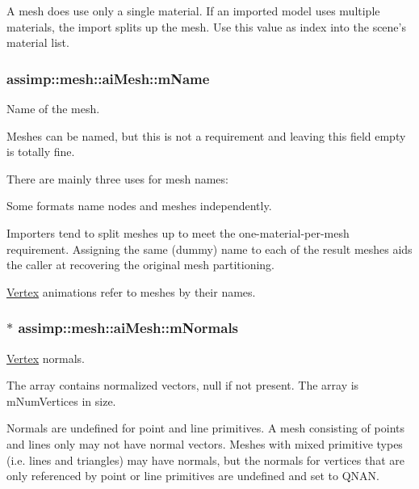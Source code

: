 A mesh does use only a single material. If an imported model uses multiple materials, the import splits up the mesh. Use this value as index into the scene's material list. \hypertarget{structassimp_1_1mesh_1_1ai_mesh_a3ffa3325c59b7ab92e4743862d47b70f}{
\subsubsection[{m\+Name}]{ assimp\+::mesh\+::ai\+Mesh\+::m\+Name}}\label{structassimp_1_1mesh_1_1ai_mesh_a3ffa3325c59b7ab92e4743862d47b70f}
Name of the mesh.

Meshes can be named, but this is not a requirement and leaving this field empty is totally fine.

There are mainly three uses for mesh names\+:
\begin{DoxyItemize}
\item Some formats name nodes and meshes independently.
\item Importers tend to split meshes up to meet the one-\/material-\/per-\/mesh requirement. Assigning the same (dummy) name to each of the result meshes aids the caller at recovering the original mesh partitioning.
\item \hyperlink{struct_vertex}{Vertex} animations refer to meshes by their names. 
\end{DoxyItemize}\hypertarget{structassimp_1_1mesh_1_1ai_mesh_aee935013afc416792a945b36f7e99d5f}{
\subsubsection[{m\+Normals}]{$\ast$ assimp\+::mesh\+::ai\+Mesh\+::m\+Normals}}\label{structassimp_1_1mesh_1_1ai_mesh_aee935013afc416792a945b36f7e99d5f}
\hyperlink{struct_vertex}{Vertex} normals.

The array contains normalized vectors, null if not present. The array is {\ttfamily m\+Num\+Vertices} in size.

Normals are undefined for point and line primitives. A mesh consisting of points and lines only may not have normal vectors. Meshes with mixed primitive types (i.\+e. lines and triangles) may have normals, but the normals for vertices that are only referenced by point or line primitives are undefined and set to {\ttfamily Q\+N\+A\+N}.

